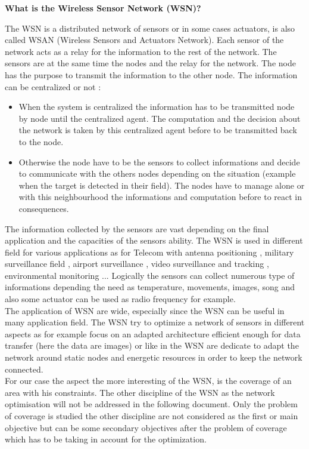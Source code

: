 \textbf{What is the Wireless Sensor Network (WSN)? }

 The WSN is a distributed network of sensors or in some cases actuators, is also called WSAN (Wireless Sensors and Actuators Network). Each sensor of the network acts as a relay for the information to the rest of the network.  
The sensors are at the same time the nodes and the relay for the network. The node has the purpose to transmit the information to the other node. 
The information can be centralized or not :
\begin{itemize}
\item When the system is centralized the information has to be transmitted node by node until the centralized agent. The computation and the decision about the network is taken by this centralized agent before to be transmitted back to the node. 
\item Otherwise the node have to be the sensors to collect informations and decide to communicate with the others nodes depending on the situation (example when the target is detected in their field). The nodes have to manage alone or with this neighbourhood the informations and computation before to react in consequences. 

\end{itemize}
 
The information collected by the sensors are vast depending on the final application and the capacities of the sensors ability. 
The WSN is used in different field for various applications as for Telecom with antenna positioning \cite{59*wang2008}, military surveillance field \cite{38*liu2010,101*topcuoglu2009}, airport surveillance \cite{37*ma2012}, video surveillance and tracking \cite{38*liu2010}, environmental monitoring \cite{42*bulusu2001}... 
Logically the sensors can collect numerous type of informations depending the need as temperature, movements, images, song and also some  actuator can be used as radio frequency for example.\\
 The application of WSN are wide, especially since the WSN can be useful in many application field. The WSN try to optimize a network of sensors in different aspects as for example \cite{39*wu2011} focus on an adapted architecture efficient enough for data transfer (here the data are images) or like in \cite{40*sohrabi2000} the WSN are dedicate to adapt the network around static nodes and energetic resources in order to keep the network connected.  \\
For our case the aspect the more interesting of the WSN, is the coverage of an area with his constraints.
 The other discipline of the WSN as the network optimisation will not be addressed in the following document. Only the problem of coverage is studied the other discipline are not considered as the first or main objective but can be some secondary objectives after the problem of coverage which has to be taking in account for the optimization. 

